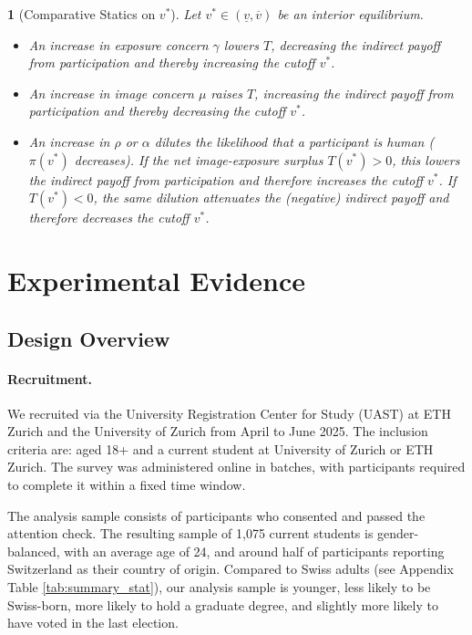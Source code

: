 \documentclass[12pt,notitlepage]{article}
\theoremstyle{plain}
\theoremstyle{plain}
\theoremstyle{definition}
\theoremstyle{definition}
\theoremstyle{assumption}
\theoremstyle{plain}
\theoremstyle{plain}
\theoremstyle{plain}
\newtheorem{proposition}{\protect\propositionname}
\theoremstyle{plain}
\theoremstyle{definition}%
\theoremstyle{plain}
\theoremstyle{plain}
\theoremstyle{plain}
\theoremstyle{plain}
\providecommand{\propositionname}{Proposition}
\begin{document}
\begin{proposition}[Comparative Statics on $v^*$]\label{prop:comparative_statics}
    Let $v^*\in (\underline{v},\overline{v})$ be an interior equilibrium. 
    \begin{itemize}
        \item[(i)] An increase in exposure concern $\gamma$ lowers $T$, decreasing the indirect payoff from participation and thereby increasing the cutoff $v^*$.
        \item[(ii)] An increase in image concern $\mu$ raises $T$, increasing the indirect payoff from participation and thereby decreasing the cutoff $v^*$.
        \item[(iii)] An increase in $\rho$ or $\alpha$ dilutes the likelihood that a participant is human ($\pi(v^*)$ decreases). If the net image-exposure surplus $T(v^*)>0$, this lowers the indirect payoff from participation and therefore increases the cutoff $v^*$. If $T(v^*)<0$, the same dilution attenuates the (negative) indirect payoff and therefore decreases the cutoff $v^*$.

    \end{itemize}
\end{proposition}


\section{Experimental Evidence\label{sec:Design}}

\subsection{Design Overview}

\paragraph{Recruitment.} We recruited via the University Registration Center for Study (UAST) at ETH Zurich and the University of Zurich from April to June 2025. The inclusion criteria are: aged 18+ and a current student at University of Zurich or ETH Zurich. The survey was administered online in batches, with participants required to complete it within a fixed time window.


The analysis sample consists of participants who consented and passed the attention check. The resulting sample of 1,075 current students is gender-balanced, with an average age of 24, and around half of participants reporting Switzerland as their country of origin. Compared to Swiss adults (see Appendix Table \ref{tab:summary_stat}), our analysis sample is younger, less likely to be Swiss-born, more likely to hold a graduate degree, and slightly more likely to have voted in the last election.
\end{document}
